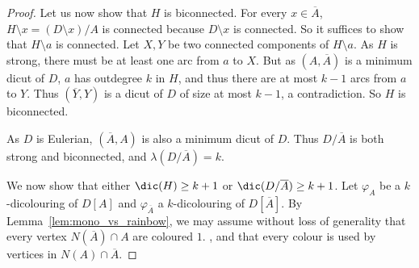 \begin{proof}
    Let us now show that $H$ is biconnected. 
    For every $x \in \overline A$, $H \setminus x = (D \setminus x)/A$ is connected because $D \setminus x$ is connected. So it suffices to show that $H \setminus a$ is connected. 
    Let $X,Y$ be two connected components of $H \setminus a$. As $H$ is strong, there must be at least one arc from $a$ to $X$. But as $(A, \overline{A})$ is a minimum dicut of $D$, $a$ has outdegree $k$ in $H$, and thus there are at most $k-1$ arcs from $a$ to $Y$. Thus $(\overline{Y},Y)$ is a dicut of $D$ of size at most $k-1$, a contradiction.  So $H$ is biconnected. 
     
    As $D$ is Eulerian, $(\overline{A},A)$ is also a minimum dicut of $D$. %
    Thus $D/\overline{A}$ is both strong and biconnected, and $\lambda(D/\overline{A}) = k$. 
    
    
    We now show that either $\dic(H) \geq  k + 1$ or $\dic(D/\overline{A}) \geq  k+1$.
    Let $\varphi_{A}$ be a $k$-dicolouring of $D[A]$ and $\varphi_{\overline{A}}$  a $k$-dicolouring of $D[\overline{A}]$.
    By Lemma~\ref{lem:mono_vs_rainbow}, we may assume without loss of generality that every vertex $N(\overline{A}) \cap A$ are coloured $1$. , and that every colour is used by vertices in $N(A) \cap \overline{A}$. 
    
    


\end{proof}
